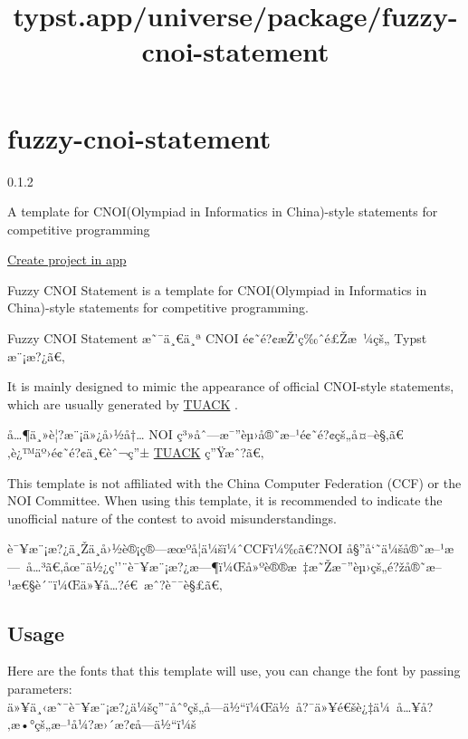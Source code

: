 \title{typst.app/universe/package/fuzzy-cnoi-statement}

\label{banner}
\label{template-thumbnail}

\section{fuzzy-cnoi-statement}\label{fuzzy-cnoi-statement}

{ 0.1.2 }

A template for CNOI(Olympiad in Informatics in China)-style statements
for competitive programming

\href{/app?template=fuzzy-cnoi-statement&version=0.1.2}{Create project
in app}

\label{readme}
Fuzzy CNOI Statement is a template for CNOI(Olympiad in Informatics in
China)-style statements for competitive programming.

Fuzzy CNOI Statement æ˜¯ä¸€ä¸ª CNOI é¢˜é?¢æŽ'ç‰ˆé£Žæ~¼çš„ Typst
æ¨¡æ?¿ã€‚

It is mainly designed to mimic the appearance of official CNOI-style
statements, which are usually generated by
\href{https://gitee.com/mulab/oi_tools}{TUACK} .

å\ldots¶ä¸»è¦?æ¨¡ä»¿å›½å†\ldots{} NOI
ç³»åˆ---æ¯''èµ›å®˜æ--¹é¢˜é?¢çš„å¤--è§‚ã€‚è¿™äº›é¢˜é?¢ä¸€èˆ¬ç''±
\href{https://gitee.com/mulab/oi_tools}{TUACK} ç''Ÿæˆ?ã€‚

This template is not affiliated with the China Computer Federation (CCF)
or the NOI Committee. When using this template, it is recommended to
indicate the unofficial nature of the contest to avoid
misunderstandings.

è¯¥æ¨¡æ?¿ä¸Žä¸­å›½è®¡ç®---æœºå­¦ä¼šï¼ˆCCFï¼‰ã€?NOI
å§''å`˜ä¼šå®˜æ--¹æ---~å\ldots³ã€‚åœ¨ä½¿ç''¨è¯¥æ¨¡æ?¿æ---¶ï¼Œå»ºè®®æ~‡æ˜Žæ¯''èµ›çš„é?žå®˜æ--¹æ€§è´¨ï¼Œä»¥å\ldots?é€~æˆ?è¯¯è§£ã€‚

\subsection{Usage}\label{usage}

Here are the fonts that this template will use, you can change the font
by passing parameters:\\
ä»¥ä¸‹æ˜¯è¯¥æ¨¡æ?¿ä¼šç''¨åˆ°çš„å­---ä½``ï¼Œä½~å?¯ä»¥é€šè¿‡ä¼~å\ldots¥å?‚æ•°çš„æ--¹å¼?æ›´æ?¢å­---ä½``ï¼š

